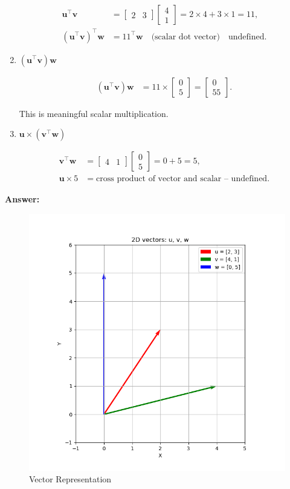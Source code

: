 \documentclass[journal]{IEEEtran}
\begin{document}
\begin{enumerate}[label=\alph*)]
  \begin{align*}
  \mathbf{u}^\top \mathbf{v} &= \begin{bmatrix} 2 & 3 \end{bmatrix} \begin{bmatrix} 4 \\ 1 \end{bmatrix} = 2 \times 4 + 3 \times 1 = 11,
  \\
  (\mathbf{u}^\top \mathbf{v})^\top \mathbf{w} &= 11^\top \mathbf{w} \quad \text{(scalar dot vector)} \quad \text{undefined}.
  \end{align*}

  \item \( (\mathbf{u}^\top \mathbf{v}) \mathbf{w} \)

  \begin{align*}
  (\mathbf{u}^\top \mathbf{v}) \mathbf{w} &= 11 \times \begin{bmatrix} 0 \\ 5 \end{bmatrix} = \begin{bmatrix} 0 \\ 55 \end{bmatrix}.
  \end{align*}

  This is meaningful scalar multiplication.

  \item \( \mathbf{u} \times (\mathbf{v}^\top \mathbf{w}) \)

  \begin{align*}
  \mathbf{v}^\top \mathbf{w} &= \begin{bmatrix} 4 & 1 \end{bmatrix} \begin{bmatrix} 0 \\ 5 \end{bmatrix} = 0 + 5 = 5,
  \\
  \mathbf{u} \times 5 &= \text{cross product of vector and scalar -- undefined}.
  \end{align*}
  
\end{enumerate}

\textbf{Answer:}
\begin{figure}[htbp]
    \centering
    \includegraphics[width=0.65\linewidth]{FIG/fig1.png}
    \caption{Vector Representation}
    \label{fig:FIG/fig1.png}
    \end{figure}
\end{document}
